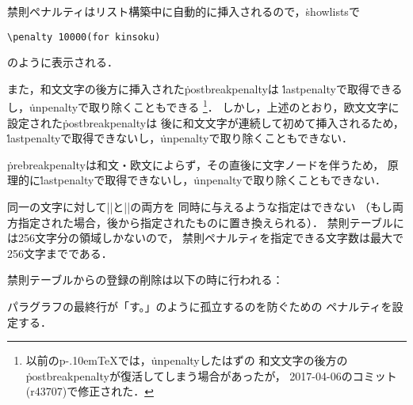 \documentclass[a4paper,11pt,nomag]{jsarticle}
\def\pTeX{p\kern-.10em\TeX}
\def\_{\leavevmode\vrule width .45em height -.2ex depth .3ex\relax}
\begin{document}
\begin{dangerous}
禁則ペナルティはリスト構築中に自動的に挿入されるので，\.{showlists}で
\begin{verbatim}
\penalty 10000(for kinsoku)
\end{verbatim}
のように表示される．

また，和文文字の後方に挿入された\.{postbreakpenalty}は
\.{lastpenalty}で取得できるし，\.{unpenalty}で取り除くこともできる
\footnote{以前の\pTeX では，\.{unpenalty}したはずの
和文文字の後方の\.{postbreakpenalty}が復活してしまう場合があったが，
2017-04-06のコミット(r43707)で修正された\cite{build11}．}．
しかし，上述のとおり，欧文文字に設定された\.{postbreakpenalty}は
後に和文文字が連続して初めて挿入されるため，
\.{lastpenalty}で取得できないし，\.{unpenalty}で取り除くこともできない．

\.{prebreakpenalty}は和文・欧文によらず，その直後に文字ノードを伴うため，
原理的に\.{lastpenalty}で取得できないし，\.{unpenalty}で取り除くこともできない．
\end{dangerous}

同一の文字に対して|\prebreakpenalty|と|\postbreakpenalty|の両方を
同時に与えるような指定はできない
（もし両方指定された場合，後から指定されたものに置き換えられる）．
禁則テーブルには256文字分の領域しかないので，
禁則ペナルティを指定できる文字数は最大で256文字までである．

禁則テーブルからの登録の削除は以下の時に行われる\cite{build26,build57}：

\begin{cslist}
\csitem[\.{jcharwidowpenalty}=<number>]
  パラグラフの最終行が「す。」のように孤立するのを防ぐための
  ペナルティを設定する．
\end{cslist}
\end{document}
